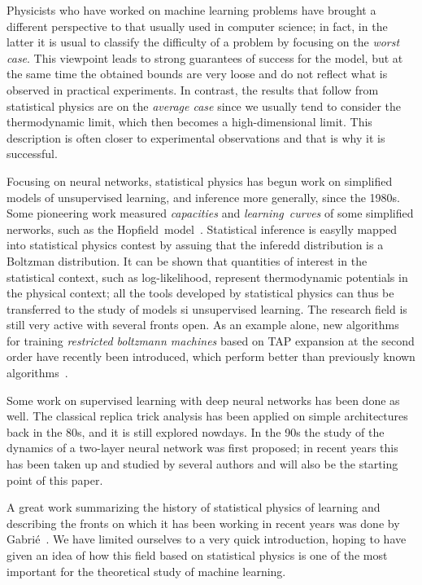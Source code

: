 Physicists who have worked on machine learning problems have brought a different perspective to that usually used in computer science;
in fact, in the latter it is usual to classify the difficulty of a problem by focusing on the \emph{worst case}.
This viewpoint leads to strong guarantees of success for the model, but at the same time the obtained bounds are very loose and do not reflect what is observed in practical experiments.
In contrast, the results that follow from statistical physics are on the \emph{average case} since we usually tend to consider the thermodynamic limit,
which then becomes a high-dimensional limit.
This description is often closer to experimental observations and that is why it is successful.

Focusing on neural networks, statistical physics has begun work on simplified models of unsupervised learning, and inference more generally, since the 1980s.
Some pioneering work measured \emph{capacities} and \emph{learning~curves} of some simplified nerworks, such as the Hopfield~model~\cite{hopfield1982neural}.
Statistical inference is easylly mapped into statistical physics contest by assuing that the inferedd distribution is a Boltzman distribution.
It can be shown that quantities of interest in the statistical context, such as log-likelihood, represent thermodynamic potentials in the physical context;
all the tools developed by statistical physics can thus be transferred to the study of models si unsupervised learning.
The research field is still very active with several fronts open.
As an example alone, new algorithms for training \emph{restricted boltzmann machines} based on TAP expansion at the second order have recently been introduced,
which perform better than previously known algorithms~\cite{gabrie18training}.

Some work on supervised learning with deep neural networks has been done as well.
The classical replica trick analysis has been applied on simple architectures back in the 80s,
and it is still explored nowdays.
In the 90s the study of the dynamics of a two-layer neural network was first proposed;
in recent years this has been taken up and studied by several authors and will also be the starting point of this paper.

A great work summarizing the history of statistical physics of learning and describing the fronts on which it has been working in recent years was done by Gabrié~\cite{gabrie2020mean}.
We have limited ourselves to a very quick introduction,
hoping to have given an idea of how this field based on statistical physics is one of the most important for the theoretical study of machine learning.

